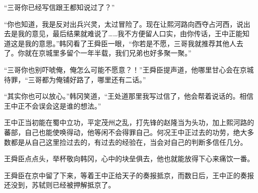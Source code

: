 “三哥你已经写信跟王都知说过了？”

“你也知道，我是反对出兵兴灵，太过冒险了。现在让熙河路向西夺占河西，说出去是我的意见，最后结果就难说了……我不方便留人口实，由你传话，王中正能知道这是我的意思。”韩冈看了王舜臣一眼，“你若是不愿，三哥我就推荐其他人去了。你就在京城里多留个一年半载，我们兄弟也好多聚一聚。”

“三哥你也别吓唬俺，俺怎么可能不愿意？！”王舜臣提声道，他哪里甘心会在京城待罪，“三哥都为俺铺好路了，哪里还有二话。”

“其实你也可以放心。”韩冈笑道，“王处道那里我写过信了，他会帮着说话的。相信王中正不会误会这是谁的想法。”

王中正当初能在蜀中立功，平定茂州之乱，打先锋的赵隆当为头功，加上熙河路的蕃部，自己也能使唤得动，他等闲不会得罪自己。何况王中正过去的功劳，绝大多数都是从自己这里捡过去的，有过去的经验在，当会对自己的判断多信任几分。

王舜臣点点头，举杯敬向韩冈，心中的块垒俱去，他也就能放得下心来痛饮一番。

王舜臣在京中留了下来，等着王中正给天子的奏报抵京，而数日后，王中正的奏报还没到，苏轼则已经被押解抵京了。

